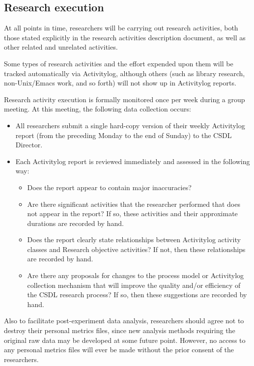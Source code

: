 \subsection{Research execution}

At all points in time, researchers will be carrying out research activities,
both those stated explicitly in the research activities description document, as
well as other related and unrelated activities.

Some types of research activities and the effort expended upon them will be
tracked automatically via Activitylog, although others (such as library
research, non-Unix/Emacs work, and so forth) will not show up in
Activitylog reports.

Research activity execution is formally monitored once per week during a
group meeting.  At this meeting, the following data collection occurs:

\begin{itemize}
\item All researchers submit a single hard-copy version of their weekly
  Activitylog report (from the preceding Monday to the end of Sunday) to
  the CSDL Director.
  
\item Each Activitylog report is reviewed immediately and assessed in the
  following way:
  \begin{itemize}
  \item Does the report appear to contain major inaccuracies?
  \item Are there significant activities that the researcher performed that
  does not appear in the  report? If so, these activities and
  their approximate durations are recorded by hand.
  \item Does the report clearly state relationships between Activitylog
  activity classes and Research objective activities?  If not, then these
  relationships are recorded by hand.
  \item Are there any proposals for changes to the process model or
  Activitylog collection mechanism that will improve the quality and/or
  efficiency of the CSDL research process?  If so, then these suggestions
  are recorded by hand.
  \end{itemize}
\end{itemize}

Also to facilitate post-experiment data analysis, researchers should agree
not to destroy their personal metrics files, since new analysis methods
requiring the original raw data may be developed at some future point.
However, no access to any personal metrics files will ever be made without
the prior consent of the researchers.


